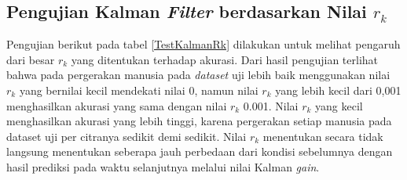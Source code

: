 \subsection{Pengujian Kalman \textit{Filter} berdasarkan Nilai $r_{k}$}
\noindent Pengujian berikut pada tabel \ref{TestKalmanRk} dilakukan untuk melihat pengaruh dari besar $r_{k}$ yang ditentukan terhadap akurasi. Dari hasil pengujian terlihat bahwa pada pergerakan manusia pada \textit{dataset} uji lebih baik menggunakan nilai $r_{k}$ yang bernilai kecil mendekati nilai 0, namun nilai $r_{k}$ yang lebih kecil dari 0,001 menghasilkan akurasi yang sama dengan nilai $r_{k}$ 0.001. Nilai $r_{k}$ yang kecil menghasilkan akurasi yang lebih tinggi, karena pergerakan setiap manusia pada dataset uji per citranya sedikit demi sedikit. Nilai $r_{k}$ menentukan secara tidak langsung menentukan seberapa jauh perbedaan dari kondisi sebelumnya dengan hasil prediksi pada waktu selanjutnya melalui nilai Kalman \textit{gain}.
\begingroup
\setlength{\LTleft}{-20cm plus -1fill}
\setlength{\LTright}{\LTleft}
